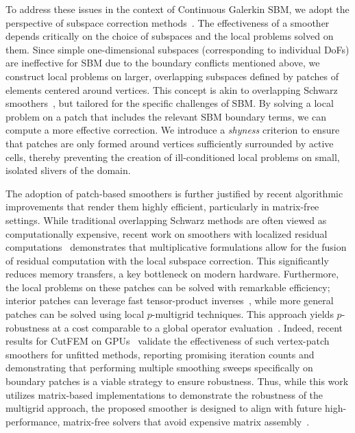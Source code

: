 \documentclass{elsarticle}
\begin{document}
To address these issues in the context of Continuous Galerkin SBM, we adopt the perspective of subspace correction
methods~\cite{xu2001method, bramble1991analysis}. The effectiveness of a smoother depends critically on the choice of
subspaces and the local problems solved on them. Since simple one-dimensional subspaces (corresponding to individual
DoFs) are ineffective for SBM due to the boundary conflicts mentioned above, we construct local problems on larger,
overlapping subspaces defined by patches of elements centered around vertices. This concept is akin to overlapping
Schwarz smoothers~\cite{pavarino1993additive}, but tailored for the specific challenges of SBM. By solving a local
problem on a patch that includes the relevant SBM boundary terms, we can compute a more effective correction. We
introduce a \emph{shyness} criterion to ensure that patches are only formed around vertices sufficiently surrounded by
active cells, thereby preventing the creation of ill-conditioned local problems on small, isolated slivers of the
domain.

The adoption of patch-based smoothers is further justified by recent algorithmic improvements that render them highly
efficient, particularly in matrix-free settings. While traditional overlapping Schwarz methods are often viewed as
computationally expensive, recent work on smoothers with localized residual computations~\cite{wichrowski2025smoothers}
demonstrates that multiplicative formulations allow for the fusion of residual computation with the local subspace
correction. This significantly reduces memory transfers, a key bottleneck on modern hardware. Furthermore, the local
problems on these patches can be solved with remarkable efficiency; interior patches can leverage fast tensor-product
inverses~\cite{witte2021fast, cui2025multigrid}, while more general patches can be solved using local $p$-multigrid
techniques. This approach yields $p$-robustness at a cost comparable to a global operator
evaluation~\cite{wichrowski2025multigrid, wichrowski2025local}. Indeed, recent results for CutFEM on
GPUs~\cite{cui2025multigrid} validate the effectiveness of such vertex-patch smoothers for unfitted methods, reporting
promising iteration counts and demonstrating that performing multiple smoothing sweeps specifically on boundary patches
is a viable strategy to ensure robustness. Thus, while this work utilizes matrix-based implementations to demonstrate
the robustness of the multigrid approach, the proposed smoother is designed to align with future high-performance,
matrix-free solvers that avoid expensive matrix
assembly~\cite{kronbichler2019fast,wichrowski2025largeStrain,witte2021fast}.
\end{document}
